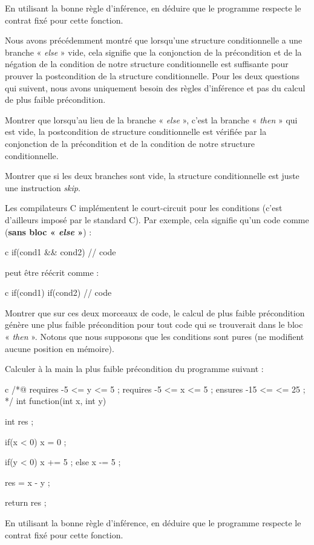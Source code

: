 En utilisant la bonne règle d'inférence, en déduire que le programme respecte le 
contrat fixé pour cette fonction.




Nous avons précédemment montré que lorsqu'une structure conditionnelle a une branche
« \textit{else} » vide, cela signifie que la conjonction de la précondition et de la négation
de la condition de notre structure conditionnelle est suffisante pour prouver la
postcondition de la structure conditionnelle.
Pour les deux questions qui suivent, nous avons uniquement besoin des règles d'inférence
et pas du calcul de plus faible précondition.


Montrer que lorsqu'au lieu de la branche « \textit{else} », c'est la branche « \textit{then} » qui est
vide, la postcondition de structure conditionnelle est vérifiée par la conjonction de
la précondition et de la condition de notre structure conditionnelle.


Montrer que si les deux branches sont vide, la structure conditionnelle est juste une
instruction \textit{skip}.




Les compilateurs C implémentent le court-circuit pour les conditions (c'est d'ailleurs
imposé par le standard C). Par exemple, cela signifie qu'un code comme (\textbf{sans
bloc « \textit{else} »}) :


\begin{CodeBlock}{c}
if(cond1 && cond2){
  // code
}
\end{CodeBlock}


peut être réécrit comme :


\begin{CodeBlock}{c}
if(cond1){
  if(cond2){    
    // code
  }
}
\end{CodeBlock}


Montrer que sur ces deux morceaux de code, le calcul de plus faible précondition
génère une plus faible précondition pour tout code qui se trouverait dans le bloc
« \textit{then} ». Notons que nous supposons que les conditions sont pures (ne modifient aucune
position en mémoire).





Calculer à la main la plus faible précondition du programme suivant :


\begin{CodeBlock}{c}
/*@ 
  requires -5 <= y <= 5 ; 
  requires -5 <= x <= 5 ; 
  ensures  -15 <= \result <= 25 ;
*/
int function(int x, int y){
  int res ;

  if(x < 0){
    x = 0 ;
  }
  
  if(y < 0){
    x += 5 ;
  } else {
    x -= 5 ;
  }
  
  res = x - y ;

  return res ;
}
\end{CodeBlock}



En utilisant la bonne règle d'inférence, en déduire que le programme respecte le 
contrat fixé pour cette fonction.
